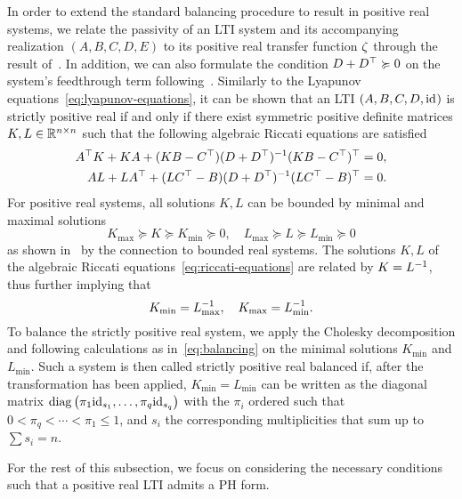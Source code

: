In order to extend the standard balancing procedure to result in positive real systems, we relate the passivity of an \ac{LTI} system and its accompanying realization $(A, B, C, D, E)$ to its positive real transfer function $\tfunc$ through the result of~\cite[Corollary~2.7]{CGH2022}.
In addition, we can also formulate the condition $D + D\trans \succcurlyeq 0$ on the system's feedthrough term following~\cite[Definition~5]{Gugercin2007}.
Similarly to the Lyapunov equations~\eqref{eq:lyapunov-equations}, it can be shown that an \ac{LTI} $(A, B, C, D, \id)$ is strictly positive real if and only if there exist symmetric positive definite matrices $K, L \in \bb{R}^{n \times n}$ such that the following algebraic Riccati equations are satisfied
\begin{equation}\label{eq:riccati-equations}
    \begin{aligned}
        A\trans K + K A + (K B - C\trans) (D + D\trans)\inv (K B - C\trans)\trans &= 0, \\
        A L + L A\trans + (L C\trans - B) (D + D\trans)\inv (L C\trans - B)\trans &= 0.
    \end{aligned}
\end{equation}
For positive real systems, all solutions $K, L$ can be bounded by minimal and maximal solutions
\begin{equation*}
    K_{\max} \succcurlyeq K \succcurlyeq K_{\min} \succcurlyeq 0,\quad L_{\max} \succcurlyeq L \succcurlyeq L_{\min} \succcurlyeq 0
\end{equation*}
as shown in~\cite[Proposition~5.1]{Ober1991} by the connection to bounded real systems.
The solutions $K, L$ of the algebraic Riccati equations~\eqref{eq:riccati-equations} are related by $K = L\inv$, thus further implying that
\begin{equation*}
    K_{\min} = L_{\max}\inv,\quad K_{\max} = L_{\min}\inv.
\end{equation*}
To balance the strictly positive real system, we apply the Cholesky decomposition and following calculations as in~\eqref{eq:balancing} on the minimal solutions $K_{\min}$ and $L_{\min}$.
Such a system is then called strictly positive real balanced if, after the transformation has been applied, $K_{\min} = L_{\min}$ can be written as the diagonal matrix $\diag{\pi_1 \id[s_1], \dots, \pi_q \id[s_q]}$ with the $\pi_i$ ordered such that $0 < \pi_q < \cdots < \pi_1 \leq 1$, and $s_i$ the corresponding multiplicities that sum up to $\sum s_i = n$.

For the rest of this subsection, we focus on considering the necessary conditions such that a positive real \ac{LTI} admits a \ac{PH} form.

